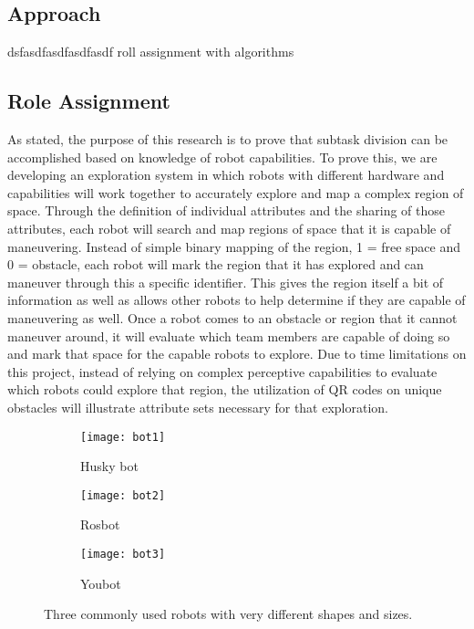 \subsection{Approach}

dsfasdfasdfasdfasdf
roll assignment with algorithms 


\subsection{Role Assignment}

As stated, the purpose of this research is to prove that subtask division can
be accomplished based on knowledge of robot capabilities. To prove this, we are
developing an exploration system in which robots with different hardware and
capabilities will work together to accurately explore and map a complex region
of space. Through the definition of individual attributes and the sharing of
those attributes, each robot will search and map regions of space that it is
capable of maneuvering. Instead of simple binary mapping of the region, 1 =
free space and 0 = obstacle, each robot will mark the region that it has
explored and can maneuver through this a specific identifier. This gives the
region itself a bit of information as well as allows other robots to help
determine if they are capable of maneuvering as well.
Once a robot comes to an obstacle or region that it cannot maneuver around,
it will evaluate which team members are capable of doing so and mark that space
for the capable robots to explore. Due to time limitations on this project,
instead of relying on complex perceptive capabilities to evaluate which robots
could explore that region, the utilization of QR codes on unique obstacles will
illustrate attribute sets necessary for that exploration.

\begin{figure}
    \centering
    \begin{subfigure}[b]{0.15\textwidth}
        \texttt{[image: bot1]}
        \caption{Husky bot}
        \label{fig:bot1}
    \end{subfigure}
    \begin{subfigure}[b]{0.15\textwidth}
        \texttt{[image: bot2]}
        \caption{Rosbot}
        \label{fig:bot2}
    \end{subfigure}
    \begin{subfigure}[b]{0.15\textwidth}
        \texttt{[image: bot3]}
        \caption{Youbot}
        \label{fig:bot3}
    \end{subfigure}
    \caption{Three commonly used robots with very different shapes and sizes.}\label{fig:bots}
\end{figure}

